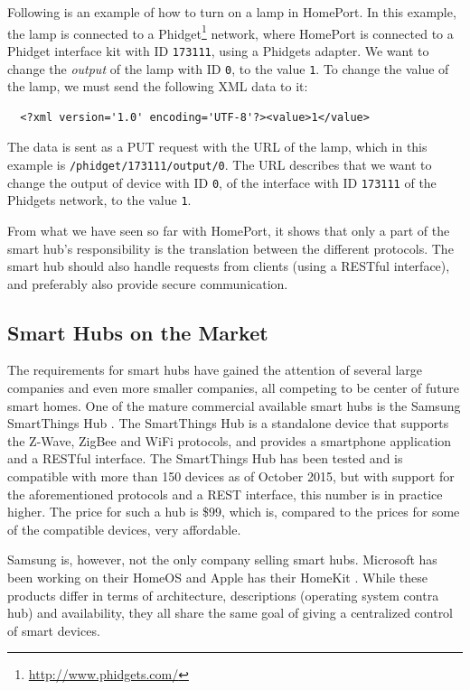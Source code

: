Following is an example of how to turn on a lamp in HomePort.
In this example, the lamp is connected to a Phidget\footnote{\url{http://www.phidgets.com/}} network, 
where HomePort is connected to a Phidget interface kit with ID \texttt{173111}, 
using a Phidgets adapter. 
We want to change the \emph{output} of the lamp with ID \texttt{0}, 
to the value \texttt{1}. 
To change the value of the lamp, 
we must send the following XML data to it:

\begin{verbatim}
  <?xml version='1.0' encoding='UTF-8'?><value>1</value>
\end{verbatim}

The data is sent as a PUT request with the URL of the lamp, 
which in this example is \texttt{/phidget/173111/output/0}. 
The URL describes that we want to change the output of device with ID \texttt{0}, 
of the interface with ID \texttt{173111} of the Phidgets network, to the value \texttt{1}.

From what we have seen so far with HomePort, 
it shows that only a part of the smart hub's responsibility is the translation between the different protocols. 
The smart hub should also handle requests from clients (\eg using a RESTful interface), 
and preferably also provide secure communication. 

\subsection{Smart Hubs on the Market}\label{sec:smarthubsmarket}
The requirements for smart hubs have gained the attention of several large companies and even more smaller companies, 
all competing to be center of future smart homes. 
One of the mature commercial available smart hubs is the Samsung SmartThings Hub \cite{SMARTTHINGS}. 
The SmartThings Hub is a standalone device that supports the Z-Wave, ZigBee and WiFi protocols, 
and provides a smartphone application and a RESTful interface. 
The SmartThings Hub has been tested and is compatible with more than 150 devices as of October 2015,
but with support for the aforementioned protocols and a REST interface, this number is in practice higher.  
The price for such a hub is \$99, which is, compared to the prices for some of the compatible devices, very affordable. 

Samsung is, however, not the only company selling smart hubs. 
Microsoft has been working on their HomeOS \cite{HOMEOS} and Apple has their HomeKit \cite{HOMEKIT}.
While these products differ in terms of architecture, descriptions (operating system contra hub) and availability,
they all share the same goal of giving a centralized control of smart devices. 


